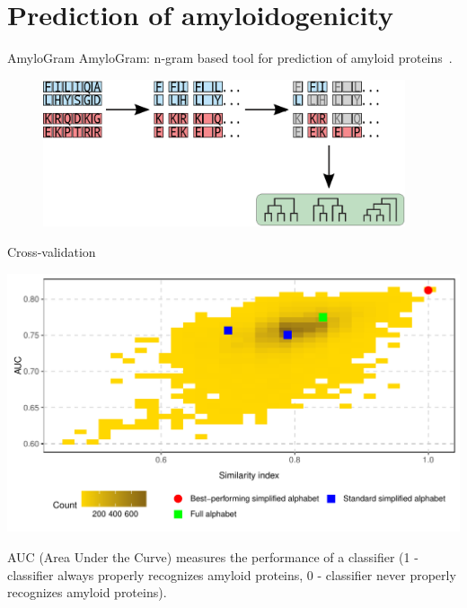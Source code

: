 \documentclass{beamer}\usepackage[]{graphicx}\usepackage[]{color}
\makeatletter
\def\maxwidth{ %
  \ifdim\Gin@nat@width>\linewidth
    \linewidth
  \else
    \Gin@nat@width
  \fi
}
\newenvironment{knitrout}{}{} %
\makeatother
\begin{document}
\section{Prediction of amyloidogenicity}

\begin{frame}{AmyloGram}
AmyloGram: n-gram based tool for prediction of amyloid proteins~\citep{burdukiewicz_prediction_2016}.
\end{frame}


    \begin{frame}
\begin{figure} 
\includegraphics[width=0.95\textwidth]{static_figure/ngram1.eps}
\end{figure}
  \end{frame}

\begin{frame}{Cross-validation}
\begin{knitrout}
\color{fgcolor}

{\centering \includegraphics[width=\maxwidth]{figure/unnamed-chunk-10-1} 

}



\end{knitrout}
AUC (Area Under the Curve) measures the performance of a classifier (1 - classifier always properly recognizes amyloid proteins, 0 - classifier never properly recognizes amyloid proteins).

\end{frame}
\end{document}
